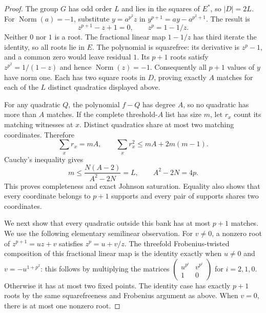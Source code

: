 \begin{proof}
The group $G$ has odd order $L$ and lies in the squares of $E^*$, so
$|D|=2L$. For $\operatorname{Norm}(a)=-1$, substitute
$y=a^{p^2}z$ in $y^{p+1}=ay-a^{p^2+1}$. The result is
\[
 z^{p+1}-z+1=0,\qquad z^p=1-1/z.
\]
Neither $0$ nor $1$ is a root. The fractional linear map $1-1/z$
has third iterate the identity, so all roots lie in $E$. The polynomial
is squarefree: its derivative is $z^p-1$, and a common zero would leave
residual $1$. Its $p+1$ roots satisfy
$z^{p^2}=1/(1-z)$ and hence $\operatorname{Norm}(z)=-1$.
Consequently all $p+1$ values of $y$ have norm one. Each has two square
roots in $D$, proving exactly $A$ matches for each of the $L$ distinct
quadratics displayed above.

For any quadratic $Q$, the polynomial $f-Q$ has degree $A$, so no
quadratic has more than $A$ matches. If the complete threshold-$A$ list
has size $m$, let $r_x$ count its matching witnesses at $x$. Distinct
quadratics share at most two matching coordinates. Therefore
\[
 \sum_x r_x=mA,\qquad
 \sum_xr_x^2\le mA+2m(m-1).
\]
Cauchy's inequality gives
\[
 m\le\frac{N(A-2)}{A^2-2N}=L,
 \qquad A^2-2N=4p.
\]
This proves completeness and exact Johnson saturation. Equality also
shows that every coordinate belongs to $p+1$ supports and every pair
of supports shares two coordinates.

We next show that every quadratic outside this bank has at most $p+1$
matches. We use the following elementary semilinear observation. For
$v\ne0$, a nonzero root of $z^{p+1}=uz+v$ satisfies
$z^p=u+v/z$. The threefold Frobenius-twisted composition of this
fractional linear map is the identity exactly when
$u\ne0$ and $v=-u^{1+p^2}$: this follows by multiplying the matrices
$\left(\begin{smallmatrix}u^{p^i}&v^{p^i}\\1&0\end{smallmatrix}\right)$
for $i=2,1,0$. Otherwise it has at most two fixed points.
The identity case has exactly $p+1$ roots by the same squarefreeness
and Frobenius argument as above. When $v=0$, there is at most one
nonzero root.


\end{proof}

